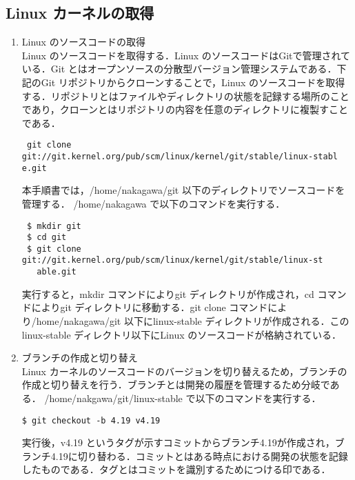 \documentclass[12pt]{jsarticle}
\begin{document}
\subsection{Linux カーネルの取得}\label{sec:syutoku}
  \begin{enumerate}
  \item Linux のソースコードの取得\\    
    Linux のソースコードを取得する．Linux のソースコードはGitで管理されている．Git とはオープンソースの分散型バージョン管理システムである．下記のGit リポジトリからクローンすることで，Linux のソースコードを取得する．リポジトリとはファイルやディレクトリの状態を記録する場所のことであり，クローンとはリポジトリの内容を任意のディレクトリに複製すことである．
\begin{verbatim}
 git clone git://git.kernel.org/pub/scm/linux/kernel/git/stable/linux-stabl
e.git
\end{verbatim}
本手順書では，/home/nakagawa/git 以下のディレクトリでソースコードを管理する．
/home/nakagawa で以下のコマンドを実行する．
\begin{verbatim}
 $ mkdir git
 $ cd git
 $ git clone git://git.kernel.org/pub/scm/linux/kernel/git/stable/linux-st
   able.git
\end{verbatim}
実行すると，mkdir コマンドによりgit ディレクトリが作成され，cd コマンドによりgit ディレクトリに移動する．git clone コマンドにより/home/nakagawa/git 以下にlinux-stable ディレクトリが作成される．このlinux-stable ディレクトリ以下にLinux のソースコードが格納されている．
\item ブランチの作成と切り替え\\
  Linux カーネルのソースコードのバージョンを切り替えるため，ブランチの作成と切り替えを行う．ブランチとは開発の履歴を管理するため分岐である．
  /home/nakgawa/git/linux-stable で以下のコマンドを実行する．
\begin{verbatim}
$ git checkout -b 4.19 v4.19
\end{verbatim}
  実行後，v4.19 というタグが示すコミットからブランチ4.19が作成され，ブランチ4.19に切り替わる．コミットとはある時点における開発の状態を記録したものである．タグとはコミットを識別するためにつける印である．
  \end{enumerate}
  
\end{document}
